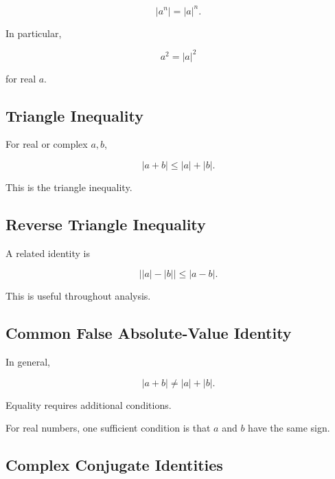 \[
\boxed{
|a^n|
=
|a|^n.
}
\]

In particular,

\[
\boxed{
a^2
=
|a|^2
}
\]

for real \(a\).

\subsection{Triangle Inequality}
\label{subsec:triangle-inequality-algebraic}

For real or complex \(a,b\),

\[
\boxed{
|a+b|
\leq
|a|+|b|.
}
\]

This is the triangle inequality.

\subsection{Reverse Triangle Inequality}
\label{subsec:reverse-triangle-inequality}

A related identity is

\[
\boxed{
\bigl||a|-|b|\bigr|
\leq
|a-b|.
}
\]

This is useful throughout analysis.

\subsection{Common False Absolute-Value Identity}
\label{subsec:false-absolute-value-identity}

In general,

\[
\boxed{
|a+b|
\neq
|a|+|b|.
}
\]

Equality requires additional conditions.

For real numbers, one sufficient condition is that \(a\) and \(b\) have the
same sign.

\subsection{Complex Conjugate Identities}
\label{subsec:complex-conjugate-identities}

